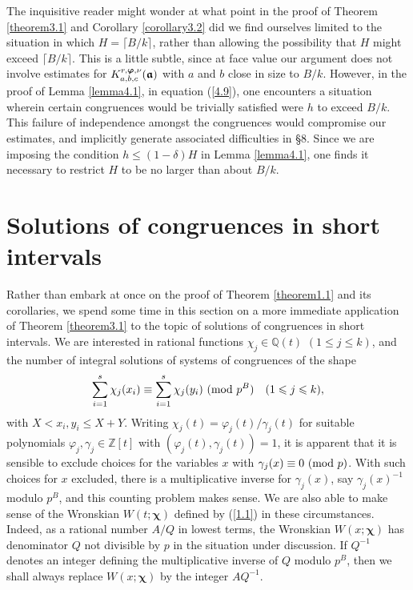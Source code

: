 \documentclass[12pt,reqno]{amsart}
\theoremstyle{definition}
\theoremstyle{remark}
\numberwithin{equation}{section}
\newcommand{\mmod}[1]{\,\,(\text{\rm mod}\,\,#1)}
\def\dbZ{{\mathbb Z}}\def\dbQ{{\mathbb Q}}
\def\gam{{\gamma}} \def\Gam{{\Gamma}}
\def\del{{\delta}} \def\Del{{\Delta}} \def\Deltil{{\widetilde \Delta}}
\def\bfchi{{\boldsymbol \chi}}
\def\le{\leqslant} \def\ge{\geqslant} \def\pleq{\preccurlyeq} \def\ple{\prec}
\begin{document}
The inquisitive reader might wonder at what point in the proof of Theorem \ref{theorem3.1} 
and Corollary \ref{corollary3.2} did we find ourselves limited to the situation in which 
$H=\lceil B/k\rceil$, rather than allowing the possibility that $H$ might exceed 
$\lceil B/k\rceil$. This is a little subtle, since at face value our argument does not involve 
estimates for $K_{a,b,c}^{r,{\boldsymbol \varphi},\nu}({\boldsymbol {{\mathfrak a}}})$ with $a$ and $b$ close in size to $B/k$. 
However, in the proof of Lemma \ref{lemma4.1}, in equation (\ref{4.9}), one encounters a 
situation wherein certain congruences would be trivially satisfied were $h$ to exceed $B/k$. 
This failure of independence amongst the congruences would compromise our estimates, and 
implicitly generate associated difficulties in \S8. Since we are imposing the condition 
$h\le (1-\del)H$ in Lemma \ref{lemma4.1}, one finds it necessary to restrict $H$ to be no 
larger than about $B/k$.

\section{Solutions of congruences in short intervals} Rather than embark at once on the 
proof of Theorem \ref{theorem1.1} and its corollaries, we spend some time in this section 
on a more immediate application of Theorem \ref{theorem3.1} to the topic of solutions of 
congruences in short intervals. We are interested in rational functions $\chi_j\in \dbQ(t)$ 
$(1\le j\le k)$, and the number of integral solutions of systems of congruences of the shape
\begin{equation}\label{11.1}
\sum_{i=1}^s\chi_j(x_i)\equiv \sum_{i=1}^s\chi_j(y_i)\mmod{p^B}\quad (1\le j\le k),
\end{equation}
with $X<x_i,y_i\le X+Y$. Writing $\chi_j(t)=\varphi_j(t)/\gam_j(t)$ for suitable polynomials 
$\varphi_j,\gam_j\in \dbZ[t]$ with $(\varphi_j(t),\gam_j(t))=1$, it is apparent that it is 
sensible to exclude choices for the variables $x$ with $\gam_j(x)\equiv 0\mmod{p}$. With 
such choices for $x$ excluded, there is a multiplicative inverse for $\gam_j(x)$, say 
$\gam_j(x)^{-1}$ modulo $p^B$, and this counting problem makes sense. We are also 
able to make sense of the Wronskian $W(t;\bfchi)$ defined by (\ref{1.1}) in these 
circumstances. Indeed, as a rational number $A/Q$ in lowest terms, the Wronskian 
$W(x;\bfchi)$ has denominator $Q$ not divisible by $p$ in the situation under discussion. If 
$Q^{-1}$ denotes an integer defining the multiplicative inverse of $Q$ modulo $p^B$, then 
we shall always replace $W(x;\bfchi)$ by the integer $AQ^{-1}$.\par
\end{document}
